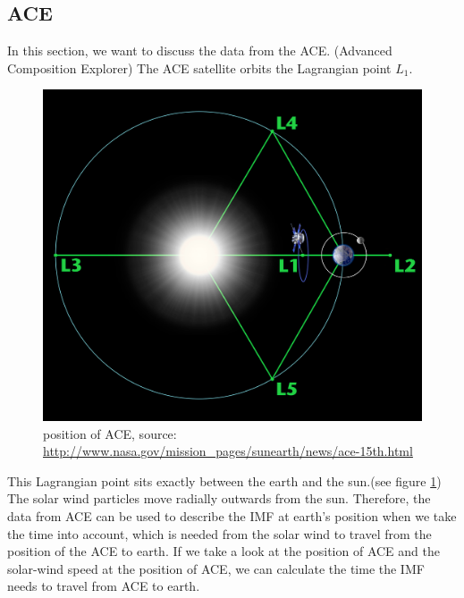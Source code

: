 \documentclass[10pt,a4paper]{article}
\begin{document}
\subsection{ACE \label{0_CHAPTER_ACE}}
In this section, we want to discuss the data from the ACE. (Advanced Composition Explorer)
The ACE satellite orbits the Lagrangian point $L_1$.
\begin{figure}[h]
\centering
\includegraphics[scale=0.06]{ACEposition.jpg}
\caption{position of ACE, source: \url{http://www.nasa.gov/mission_pages/sunearth/news/ace-15th.html} }
\label{position of ACE}
\end{figure}

This Lagrangian point sits exactly between the earth and the sun.(see figure \ref{position of ACE}) The solar wind particles move radially outwards from the sun. Therefore, the data from ACE can be used to describe the IMF at earth's position when we take the time into account, which is needed from the solar wind to travel from the position of the ACE to earth. 
If we take a look at the position of ACE and the solar-wind speed at the position of ACE, we can calculate the time the IMF needs to travel from ACE to earth. 
\end{document}

